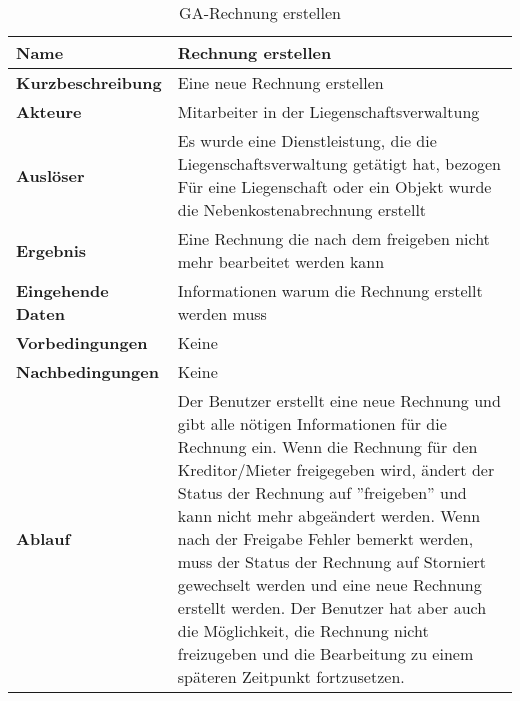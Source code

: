 \begin{table}[H]
  \centering
  \settowidth{}
  \setlength\extrarowheight{2pt}
  \begin{tabulary}{1.0\textwidth}{|a|m{12cm}|}
    \hline
    \textbf{Name}&Rechnung erstellen\\
    \hline 
    \textbf{Kurzbeschreibung} & Eine neue Rechnung erstellen\\
    \hline
    \textbf{Akteure} & Mitarbeiter in der Liegenschaftsverwaltung\\
    \hline
    \textbf{Auslöser} & Es wurde eine Dienstleistung, die die Liegenschaftsverwaltung getätigt hat, bezogen \newline 
    Für eine Liegenschaft oder ein Objekt wurde die Nebenkostenabrechnung erstellt\\
    \hline
    \textbf{Ergebnis} & Eine Rechnung die nach dem freigeben nicht mehr bearbeitet werden kann\\
    \hline
    \textbf{Eingehende Daten} & Informationen warum die Rechnung erstellt werden muss \\
    \hline
    \textbf{Vorbedingungen} & Keine\\
    \hline
    \textbf{Nachbedingungen} & Keine\\
    \hline
    \textbf{Ablauf} & Der Benutzer erstellt eine neue Rechnung und gibt alle nötigen Informationen für die Rechnung ein. Wenn die Rechnung für den Kreditor/Mieter freigegeben wird, ändert der Status der Rechnung auf ''freigeben'' und kann nicht mehr abgeändert werden. Wenn nach der Freigabe Fehler bemerkt werden, muss der Status der Rechnung auf Storniert gewechselt werden und eine neue Rechnung erstellt werden. Der Benutzer hat aber auch die Möglichkeit, die Rechnung nicht freizugeben und die Bearbeitung zu einem späteren Zeitpunkt fortzusetzen.\\
    \hline
  \end{tabulary}
  \caption{GA-Rechnung erstellen}
  \label{GA-rechnungErstellen}
\end{table}